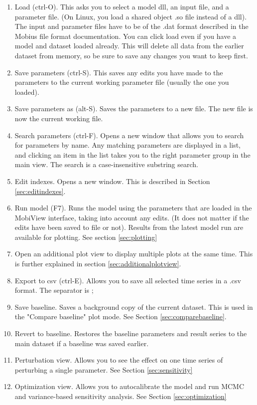 \documentclass[11pt]{article}
\theoremstyle{definition}
\begin{document}
\begin{enumerate}
\item Load (ctrl-O). This asks you to select a model dll, an input file, and a parameter file. (On Linux, you load a shared object .so file instead of a dll). The input and parameter files have to be of the .dat format described in the Mobius file format documentation. You can click load even if you have a model and dataset loaded already. This will delete all data from the earlier dataset from memory, so be sure to save any changes you want to keep first.
\item Save parameters (ctrl-S). This saves any edits you have made to the parameters to the current working parameter file (usually the one you loaded).
\item Save parameters as (alt-S). Saves the parameters to a new file. The new file is now the current working file.
\item Search parameters (ctrl-F). Opens a new window that allows you to search for parameters by name. Any matching parameters are displayed in a list, and clicking an item in the list takes you to the right parameter group in the main view. The search is a case-insensitive substring search.
\item Edit indexes. Opens a new window. This is described in Section \ref{sec:editindexes}.

\item Run model (F7). Runs the model using the parameters that are loaded in the MobiView interface, taking into account any edits. (It does not matter if the edits have been saved to file or not). Results from the latest model run are available for plotting. See section \ref{sec:plotting}
\item Open an additional plot view to display multiple plots at the same time. This is further explained in section \ref{sec:additionalplotview}.
\item Export to csv (ctrl-E). Allows you to save all selected time series in a .csv format. The separator is ;

\item Save baseline. Saves a background copy of the current dataset. This is used in the "Compare baseline" plot mode. See Section \ref{sec:comparebaseline}.
\item Revert to baseline. Restores the baseline parameters and result series to the main dataset if a baseline was saved earlier.
\item Perturbation view. Allows you to see the effect on one time series of perturbing a single parameter. See Section \ref{sec:sensitivity}
\item Optimization view. Allows you to autocalibrate the model and run MCMC and variance-based sensitivity analysis. See Section \ref{sec:optimization}


\end{enumerate}
\end{document}
